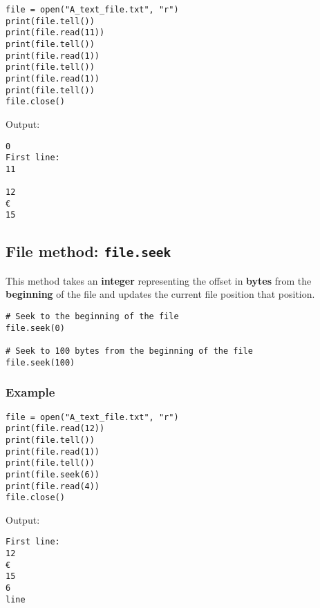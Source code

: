 \documentclass[11pt]{article}
\begin{document}
\begin{verbatim}
file = open("A_text_file.txt", "r")
print(file.tell())
print(file.read(11))
print(file.tell())
print(file.read(1))
print(file.tell())
print(file.read(1))
print(file.tell())
file.close()
\end{verbatim}

 \noindent Output:

\label{org15beb3c}
\begin{verbatim}
0
First line:
11
 
12
€
15
\end{verbatim}
\subsection{File method: \texttt{file.seek}}
\label{sec:orgf5fc2aa}
This method takes an \textbf{integer} representing the offset in \textbf{bytes} from the \textbf{beginning} of the file and updates the current file position that position.
\begin{verbatim}
# Seek to the beginning of the file
file.seek(0)

# Seek to 100 bytes from the beginning of the file
file.seek(100)
\end{verbatim}
\subsubsection{Example}
\label{sec:org78740a4}
\begin{verbatim}
file = open("A_text_file.txt", "r")
print(file.read(12))
print(file.tell())
print(file.read(1))
print(file.tell())
print(file.seek(6))
print(file.read(4))
file.close()
\end{verbatim}

 \noindent Output:

\label{org4558731}
\begin{verbatim}
First line: 
12
€
15
6
line
\end{verbatim}


 \newpage
\end{document}
